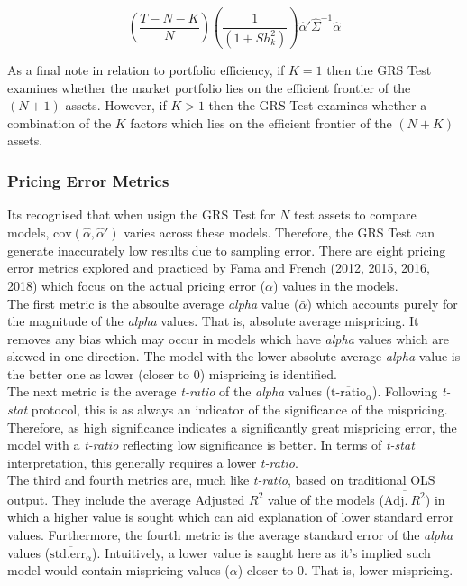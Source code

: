 \documentclass[11pt, english]{article}
\begin{document}
        $$\left(\frac{T-N-K}{N}\right)\left(\frac{1}{(1+Sh_k^2)}\right)\hat{\alpha}'\hat{\Sigma}^{-1}\hat{\alpha}$$

        As a final note in relation to portfolio efficiency, if $K=1$ then the GRS Test examines whether the market portfolio lies on the efficient frontier of the $(N+1)$ assets. However, if $K>1$ then the GRS Test examines whether a combination of the $K$ factors which lies on the efficient frontier of the $(N+K)$ assets.

		\subsubsection*{Pricing Error Metrics}

        Its recognised that when usign the GRS Test for $N$ test assets to compare models, $\mathrm{cov}(\hat{\alpha},\hat{\alpha}')$ varies across these models. Therefore, the GRS Test can generate inaccurately low results due to sampling error. There are eight pricing error metrics explored and practiced by Fama and French (2012, 2015, 2016, 2018) which focus on the actual pricing error ($\alpha$) values in the models.\\

        The first metric is the absoulte average \textit{alpha} value ($\bar{\alpha}$) which accounts purely for the magnitude of the \textit{alpha} values. That is, absolute average mispricing. It removes any bias which may occur in models which have \textit{alpha} values which are skewed in one direction. The model with the lower absolute average \textit{alpha} value is the better one as lower (closer to 0) mispricing is identified.\\

        The next metric is the average \textit{t-ratio} of the \textit{alpha} values ($\overline{\textrm{t-ratio}}_{\alpha}$). Following \textit{t-stat} protocol, this is as always an indicator of the significance of the mispricing. Therefore, as high significance indicates a significantly great mispricing error, the model with a \textit{t-ratio} reflecting low significance is better. In terms of \textit{t-stat} interpretation, this generally requires a lower \textit{t-ratio}.\\

        The third and fourth metrics are, much like \textit{t-ratio}, based on traditional OLS output. They include the average Adjusted $R^2$ value of the models ($\overline{\mathrm{Adj.}\ R^2}$) in which a higher value is sought which can aid explanation of lower standard error values. Furthermore, the fourth metric is the average standard error of the \textit{alpha} values ($\overline{\mathrm{std.err_{\alpha}}}$). Intuitively, a lower value is saught here as it's implied such model would contain mispricing values ($\alpha$) closer to 0. That is, lower mispricing.\\
\end{document}
